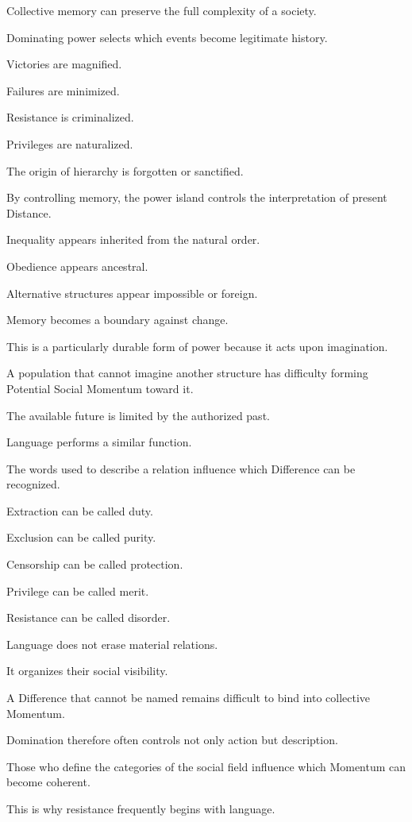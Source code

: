 Collective memory can preserve the full complexity of a society.

Dominating power selects which events become legitimate history.

Victories are magnified.

Failures are minimized.

Resistance is criminalized.

Privileges are naturalized.

The origin of hierarchy is forgotten or sanctified.

By controlling memory, the power island controls the interpretation of present Distance.

Inequality appears inherited from the natural order.

Obedience appears ancestral.

Alternative structures appear impossible or foreign.

Memory becomes a boundary against change.

This is a particularly durable form of power because it acts upon imagination.

A population that cannot imagine another structure has difficulty forming Potential Social Momentum toward it.

The available future is limited by the authorized past.

Language performs a similar function.

The words used to describe a relation influence which Difference can be recognized.

Extraction can be called duty.

Exclusion can be called purity.

Censorship can be called protection.

Privilege can be called merit.

Resistance can be called disorder.

Language does not erase material relations.

It organizes their social visibility.

A Difference that cannot be named remains difficult to bind into collective Momentum.

Domination therefore often controls not only action but description.

Those who define the categories of the social field influence which Momentum can become coherent.

This is why resistance frequently begins with language.

